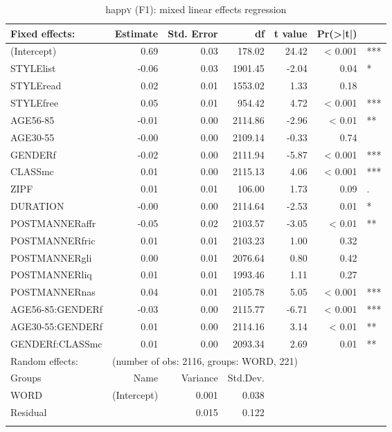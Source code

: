 	\begin{table}
		
		\caption{happ\textsc{y} (F1): mixed linear effects regression}
		\label{tab.regression.happy.f1}
		\footnotesize
		\begin{tabular}{p{}rrrrrl}
			\lsptoprule
			Fixed effects: & Estimate & Std. Error & df & t value & Pr(>|t|) & \\ 
			\midrule
			(Intercept) & 0.69 & 0.03 & 178.02 & 24.42 & < 0.001 & *** \\ 
			STYLElist & -0.06 & 0.03 & 1901.45 & -2.04 & 0.04 & * \\ 
			STYLEread & 0.02 & 0.01 & 1553.02 & 1.33 & 0.18 & \\ 
			STYLEfree & 0.05 & 0.01 & 954.42 & 4.72 & < 0.001 & *** \\ 
			AGE56-85 & -0.01 & 0.00 & 2114.86 & -2.96 & < 0.01 & **\\ 
			AGE30-55 & -0.00 & 0.00 & 2109.14 & -0.33 & 0.74 & \\ 
			GENDERf & -0.02 & 0.00 & 2111.94 & -5.87 & < 0.001 & *** \\ 
			CLASSmc & 0.01 & 0.00 & 2115.13 & 4.06 & < 0.001 & *** \\ 
			ZIPF & 0.01 & 0.01 & 106.00 & 1.73 & 0.09 & .\\ 
			DURATION & -0.00 & 0.00 & 2114.64 & -2.53 & 0.01 & *\\ 
			POSTMANNERaffr & -0.05 & 0.02 & 2103.57 & -3.05 & < 0.01 & ** \\ 
			POSTMANNERfric & 0.01 & 0.01 & 2103.23 & 1.00 & 0.32 & \\ 
			POSTMANNERgli & 0.00 & 0.01 & 2076.64 & 0.80 & 0.42 & \\ 
			POSTMANNERliq & 0.01 & 0.01 & 1993.46 & 1.11 & 0.27 & \\ 
			POSTMANNERnas & 0.04 & 0.01 & 2105.78 & 5.05 & < 0.001 & *** \\ 
			AGE56-85:GENDERf & -0.03 & 0.00 & 2115.77 & -6.71 & < 0.001 & *** \\ 
			AGE30-55:GENDERf & 0.01 & 0.00 & 2114.16 & 3.14 & < 0.01 & ** \\ 
			GENDERf:CLASSmc & 0.01 & 0.00 & 2093.34 & 2.69 & 0.01 & **\\ 
			\midrule
			Random effects: & \multicolumn{6}{l}{(number of obs: 2116, groups: WORD, 221)} \\
			Groups &         Name & Variance &      Std.Dev. & & & \\
			WORD &  (Intercept) & 0.001 & 0.038 & & & \\
			Residual  &         & 0.015 & 0.122 & & & \\
			\lspbottomrule
		\end{tabular}
	\end{table}

